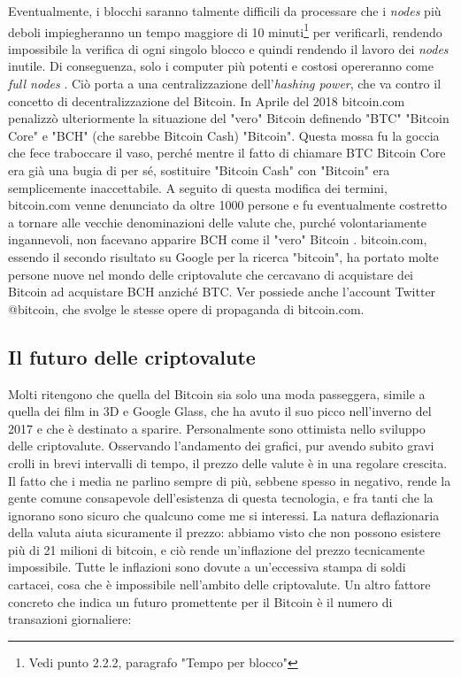 \documentclass {article}
\begin{document}
Eventualmente, i blocchi saranno talmente difficili da processare che i \textit{nodes} più deboli impiegheranno un tempo maggiore di 10 minuti\footnote{Vedi punto 2.2.2, paragrafo "Tempo per blocco"} per verificarli, rendendo impossibile la verifica di ogni singolo blocco e quindi rendendo il lavoro dei \textit{nodes} inutile.
Di conseguenza, solo i computer più potenti e costosi opereranno come \textit{full nodes} \cite{bigblocks}.
Ciò porta a una centralizzazione dell'\textit{hashing power}, che va contro il concetto di decentralizzazione del Bitcoin.
In Aprile del 2018 bitcoin.com penalizzò ulteriormente la situazione del "vero" Bitcoin definendo "BTC" "Bitcoin Core" e "BCH" (che sarebbe Bitcoin Cash) "Bitcoin".
Questa mossa fu la goccia che fece traboccare il vaso, perché mentre il fatto di chiamare BTC Bitcoin Core era già una bugia di per sé, sostituire "Bitcoin Cash" con "Bitcoin" era semplicemente inaccettabile.
A seguito di questa modifica dei termini, bitcoin.com venne denunciato da oltre 1000 persone e fu eventualmente costretto a tornare alle vecchie denominazioni delle valute che, purché volontariamente ingannevoli, non facevano apparire BCH come il "vero" Bitcoin \cite{verlawsuit}.
bitcoin.com, essendo il secondo risultato su Google per la ricerca "bitcoin", ha portato molte persone nuove nel mondo delle criptovalute che cercavano di acquistare dei Bitcoin ad acquistare BCH anziché BTC.
Ver possiede anche l'account Twitter @bitcoin, che svolge le stesse opere di propaganda di bitcoin.com.


\subsection {Il futuro delle criptovalute}


Molti ritengono che quella del Bitcoin sia solo una moda passeggera, simile a quella dei film in 3D e Google Glass, che ha avuto il suo picco nell'inverno del 2017 e che è destinato a sparire.
Personalmente sono ottimista nello sviluppo delle criptovalute.
Osservando l'andamento dei grafici, pur avendo subito gravi crolli in brevi intervalli di tempo, il prezzo delle valute è in una regolare crescita.
Il fatto che i media ne parlino sempre di più, sebbene spesso in negativo, rende la gente comune consapevole dell'esistenza di questa tecnologia, e fra tanti che la ignorano sono sicuro che qualcuno come me si interessi.
La natura deflazionaria della valuta aiuta sicuramente il prezzo: abbiamo visto che non possono esistere più di 21 milioni di bitcoin, e ciò rende un'inflazione del prezzo tecnicamente impossibile.
Tutte le inflazioni sono dovute a un'eccessiva stampa di soldi cartacei, cosa che è impossibile nell'ambito delle criptovalute.
Un altro fattore concreto che indica un futuro promettente per il Bitcoin è il numero di transazioni giornaliere:
\end{document}
